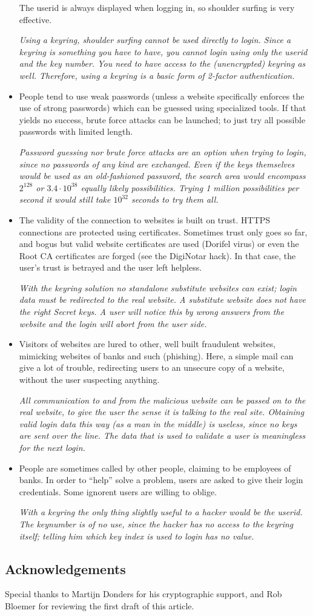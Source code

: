 \begin{itemize}
The userid is always displayed when logging in, so shoulder surfing is very effective.
\par
\emph{Using a keyring, shoulder surfing cannot be used directly to login.
Since a keyring is something you have to have, you cannot login using only the userid and the key number.
You need to have access to the (unencrypted) keyring as well.
Therefore, using a keyring is a basic form of 2-factor authentication.}
\item People tend to use weak passwords (unless a website specifically enforces the use of strong passwords) which can be guessed using specialized tools.
If that yields no success, brute force attacks can be launched; to just try all possible passwords with limited length.
\par
\emph{Password guessing nor brute force attacks are an option when trying to login, since no passwords of any kind are exchanged.
Even if the keys themselves would be used as an old-fashioned password, the search area would encompass $2^{128}$ or $3.4\cdot 10^{38}$ equally likely possibilities.
Trying 1 million possibilities per second it would still take $10^{32}$ seconds to try them all.}
\item The validity of the connection to websites is built on trust.
HTTPS connections are protected using certificates.
Sometimes trust only goes so far, and bogus but valid website certificates are used (Dorifel virus) or even the Root CA certificates are forged (see the DigiNotar hack).
In that case, the user's trust is betrayed and the user left helpless.
\par
\emph{With the keyring solution no standalone substitute websites can exist; login data must be redirected to the real website.
A substitute website does not have the right Secret keys.
A user will notice this by wrong answers from the website and the login will abort from the user side.}
\item Visitors of websites are lured to other, well built fraudulent websites, mimicking websites of banks and such (phishing).
Here, a simple mail can give a lot of trouble, redirecting users to an unsecure copy of a website, without the user suspecting anything.
\par
\emph{All communication to and from the malicious website can be passed on to the real website, to give the user the sense it is talking to the real site.
Obtaining valid login data this way (as a man in the middle) is useless, since no keys are sent over the line.
The data that is used to validate a user is meaningless for the next login.}
\item People are sometimes called by other people, claiming to be employees of banks.
In order to ``help'' solve a problem, users are asked to give their login credentials.
Some ignorent users are willing to oblige.
\par
\emph{With a keyring the only thing slightly useful to a hacker would be the userid.
The keynumber is of no use,
since the hacker has no access to the keyring itself;
telling him which key index is used to login has no value.}
\end{itemize}

\subsection{Acknowledgements}
Special thanks to Martijn Donders for his cryptographic support, and Rob Bloemer for reviewing the first draft of this article.
